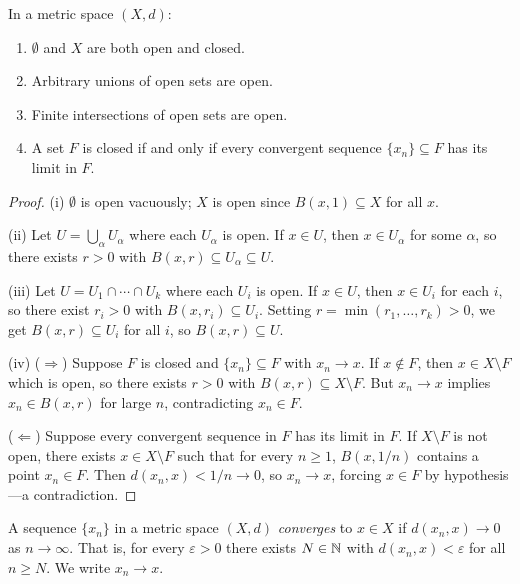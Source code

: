 \documentclass[11pt,a4paper]{article}
\begin{document}
\begin{proposition}
\label{prop:open_closed_props}
In a metric space $(X, d)$:
\begin{enumerate}[nosep,label=(\roman*)]
  \item $\emptyset$ and $X$ are both open and closed.
  \item Arbitrary unions of open sets are open.
  \item Finite intersections of open sets are open.
  \item A set $F$ is closed if and only if every convergent sequence
    $\{x_n\} \subseteq F$ has its limit in $F$.
\end{enumerate}
\end{proposition}

\begin{proof}
(i) $\emptyset$ is open vacuously; $X$ is open since $B(x, 1) \subseteq
X$ for all $x$.

(ii) Let $U = \bigcup_{\alpha} U_\alpha$ where each $U_\alpha$ is open.
If $x \in U$, then $x \in U_\alpha$ for some $\alpha$, so there exists
$r > 0$ with $B(x, r) \subseteq U_\alpha \subseteq U$.

(iii) Let $U = U_1 \cap \cdots \cap U_k$ where each $U_i$ is open. If
$x \in U$, then $x \in U_i$ for each $i$, so there exist $r_i > 0$
with $B(x, r_i) \subseteq U_i$. Setting $r = \min(r_1, \ldots, r_k)
> 0$, we get $B(x, r) \subseteq U_i$ for all $i$, so
$B(x, r) \subseteq U$.

(iv) ($\Rightarrow$) Suppose $F$ is closed and $\{x_n\} \subseteq F$
with $x_n \to x$. If $x \notin F$, then $x \in X \setminus F$ which
is open, so there exists $r > 0$ with $B(x, r) \subseteq X \setminus
F$. But $x_n \to x$ implies $x_n \in B(x, r)$ for large $n$,
contradicting $x_n \in F$.

($\Leftarrow$) Suppose every convergent sequence in $F$ has its limit
in $F$. If $X \setminus F$ is not open, there exists
$x \in X \setminus F$ such that for every $n \ge 1$, $B(x, 1/n)$
contains a point $x_n \in F$. Then $d(x_n, x) < 1/n \to 0$, so
$x_n \to x$, forcing $x \in F$ by hypothesis---a contradiction.
\end{proof}

\begin{definition}
\label{def:convergence_metric}
A sequence $\{x_n\}$ in a metric space $(X, d)$ \emph{converges} to
$x \in X$ if $d(x_n, x) \to 0$ as $n \to \infty$. That is, for every
$\varepsilon > 0$ there exists $N \in \mathbb{N}$ with
$d(x_n, x) < \varepsilon$ for all $n \ge N$. We write $x_n \to x$.
\end{definition}
\end{document}

